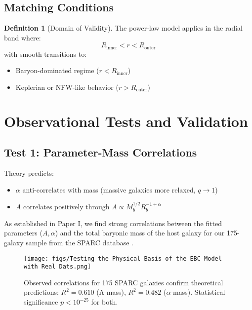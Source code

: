 \documentclass[12pt, a4paper]{article}
\theoremstyle{definition}
\newtheorem{definition}{Definition}
\theoremstyle{remark}
\begin{document}
\subsection{Matching Conditions}

\begin{definition}[Domain of Validity]
The power-law model applies in the radial band where:
\begin{equation}
R_{\text{inner}} < r < R_{\text{outer}}
\end{equation}
with smooth transitions to:
\begin{itemize}
\item Baryon-dominated regime ($r < R_{\text{inner}}$)
\item Keplerian or NFW-like behavior ($r > R_{\text{outer}}$)
\end{itemize}
\end{definition}

\section{Observational Tests and Validation}

\subsection{Test 1: Parameter-Mass Correlations}

Theory predicts:
\begin{itemize}
\item $\alpha$ anti-correlates with mass (massive galaxies more relaxed, $q \to 1$)
\item $A$ correlates positively through $A \propto M_b^{1/2}R_b^{-1+\alpha}$
\end{itemize}

As established in Paper I, we find strong correlations between the fitted parameters ($A, \alpha$) and the total baryonic mass \cite{McGaugh2000} of the host galaxy for our 175-galaxy sample from the SPARC database \cite{Lelli2016}.

\begin{figure}[H]
    \centering
    \texttt{[image: figs/Testing the Physical Basis of the EBC Model with Real Dats.png]}
    \caption{Observed correlations for 175 SPARC galaxies confirm theoretical predictions: $R^2 = 0.610$ (A-mass), $R^2 = 0.482$ ($\alpha$-mass). Statistical significance $p < 10^{-25}$ for both.}
    \label{fig:correlations}
\end{figure}
\end{document}
